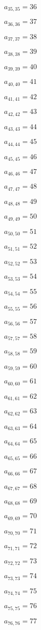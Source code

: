 \documentclass[a4paper,12pt]{article}
\begin{document}
$a _{ 35, 35 } = 36$

$a _{ 36, 36 } = 37$

$a _{ 37, 37 } = 38$

$a _{ 38, 38 } = 39$

$a _{ 39, 39 } = 40$

$a _{ 40, 40 } = 41$

$a _{ 41, 41 } = 42$

$a _{ 42, 42 } = 43$

$a _{ 43, 43 } = 44$

$a _{ 44, 44 } = 45$

$a _{ 45, 45 } = 46$

$a _{ 46, 46 } = 47$

$a _{ 47, 47 } = 48$

$a _{ 48, 48 } = 49$

$a _{ 49, 49 } = 50$

$a _{ 50, 50 } = 51$

$a _{ 51, 51 } = 52$

$a _{ 52, 52 } = 53$

$a _{ 53, 53 } = 54$

$a _{ 54, 54 } = 55$

$a _{ 55, 55 } = 56$

$a _{ 56, 56 } = 57$

$a _{ 57, 57 } = 58$

$a _{ 58, 58 } = 59$

$a _{ 59, 59 } = 60$

$a _{ 60, 60 } = 61$

$a _{ 61, 61 } = 62$

$a _{ 62, 62 } = 63$

$a _{ 63, 63 } = 64$

$a _{ 64, 64 } = 65$

$a _{ 65, 65 } = 66$

$a _{ 66, 66 } = 67$

$a _{ 67, 67 } = 68$

$a _{ 68, 68 } = 69$

$a _{ 69, 69 } = 70$

$a _{ 70, 70 } = 71$

$a _{ 71, 71 } = 72$

$a _{ 72, 72 } = 73$

$a _{ 73, 73 } = 74$

$a _{ 74, 74 } = 75$

$a _{ 75, 75 } = 76$

$a _{ 76, 76 } = 77$
\end{document}
